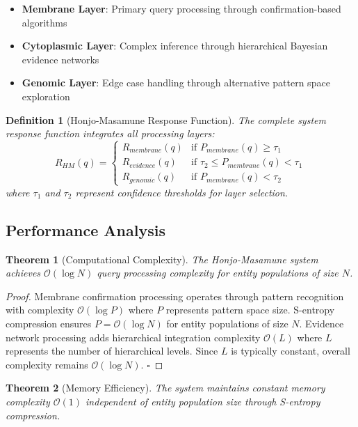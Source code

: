 \documentclass[12pt,a4paper]{article}
\newtheorem{theorem}{Theorem}
\newtheorem{definition}{Definition}
\begin{document}
\begin{itemize}
\item \textbf{Membrane Layer}: Primary query processing through confirmation-based algorithms
\item \textbf{Cytoplasmic Layer}: Complex inference through hierarchical Bayesian evidence networks
\item \textbf{Genomic Layer}: Edge case handling through alternative pattern space exploration
\end{itemize}

\begin{definition}[Honjo-Masamune Response Function]
The complete system response function integrates all processing layers:
\begin{equation}
R_{HM}(q) = \begin{cases}
R_{membrane}(q) & \text{if } P_{membrane}(q) \geq \tau_{1} \\
R_{evidence}(q) & \text{if } \tau_{2} \leq P_{membrane}(q) < \tau_{1} \\
R_{genomic}(q) & \text{if } P_{membrane}(q) < \tau_{2}
\end{cases}
\end{equation}
where $\tau_1$ and $\tau_2$ represent confidence thresholds for layer selection.
\end{definition}

\subsection{Performance Analysis}

\begin{theorem}[Computational Complexity]
The Honjo-Masamune system achieves $\mathcal{O}(\log N)$ query processing complexity for entity populations of size $N$.
\end{theorem}

\begin{proof}
Membrane confirmation processing operates through pattern recognition with complexity $\mathcal{O}(\log P)$ where $P$ represents pattern space size. S-entropy compression ensures $P = \mathcal{O}(\log N)$ for entity populations of size $N$. Evidence network processing adds hierarchical integration complexity $\mathcal{O}(L)$ where $L$ represents the number of hierarchical levels. Since $L$ is typically constant, overall complexity remains $\mathcal{O}(\log N)$. $\square$
\end{proof}

\begin{theorem}[Memory Efficiency]
The system maintains constant memory complexity $\mathcal{O}(1)$ independent of entity population size through S-entropy compression.
\end{theorem}
\end{document}
